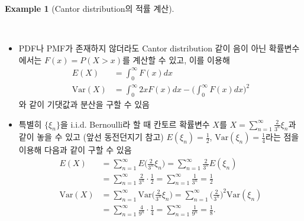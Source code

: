 \documentclass[
  letterpaper,
  DIV=11,
  numbers=noendperiod]{scrreprt}
\theoremstyle{definition}
\theoremstyle{plain}
\theoremstyle{plain}
\theoremstyle{definition}
\newtheorem{example}{Example}[chapter]
\theoremstyle{plain}
\theoremstyle{definition}
\theoremstyle{remark}
\begin{document}
\begin{example}[Cantor distribution의 적률
계산]\protect\hypertarget{exm-cantorexp}{}\label{exm-cantorexp}

~

\begin{itemize}
\item
  PDF나 PMF가 존재하지 않더라도 Cantor distribution 같이 음이 아닌
  확률변수에서는 \(F(x) = P(X>x)\)를 계산할 수 있고, 이를 이용해 \[
  \begin{aligned}
  E(X) &= \int_0^{\infty} F(x) dx\\
  \text{Var} (X) &= \int_0^{\infty} 2x F(x) dx - \Big( \int_0^{\infty}F(x) dx \Big)^2
  \end{aligned}
  \] 와 같이 기댓값과 분산을 구할 수 있음
\item
  특별히 \(\{\xi_n\}\)을 i.i.d. Bernoulli라 할 때 칸토르 확률변수
  \(X\)를 \(X=\sum_{n=1}^{\infty}\frac{2}{3^n}\xi_n\)과 같이 놓을 수
  있고 (앞선 동전던지기 참고) \(E(\xi_n)=\frac{1}{2}\),
  \(\text{Var}(\xi_n) = \frac{1}{4}\)라는 점을 이용해 다음과 같이 구할
  수 있음 \[
  \begin{aligned}
  E(X) &= \sum_{n=1}^{\infty} E\Big( \frac{2}{3^n} \xi_n \Big)= \sum_{n=1}^{\infty}  \frac{2}{3^n} E(\xi_n)\\&= \sum_{n=1}^{\infty} \frac{2}{3^n }\cdot \frac{1}{2}= \sum_{n=1}^{\infty} \frac{1}{3^n} = \frac{1}{2}\\
  \text{Var}(X) &= \sum_{n=1}^{\infty} \text{Var}\Big( \frac{2}{3^n} \xi_n \Big)= \sum_{n=1}^{\infty}  \Big(\frac{2}{3^n}\Big)^2 \text{Var}(\xi_n)\\&= \sum_{n=1}^{\infty} \frac{4}{9^n }\cdot \frac{1}{4}= \sum_{n=1}^{\infty} \frac{1}{9^n} = \frac{1}{8}.
  \end{aligned}
  \]
\end{itemize}

\end{example}
\end{document}
